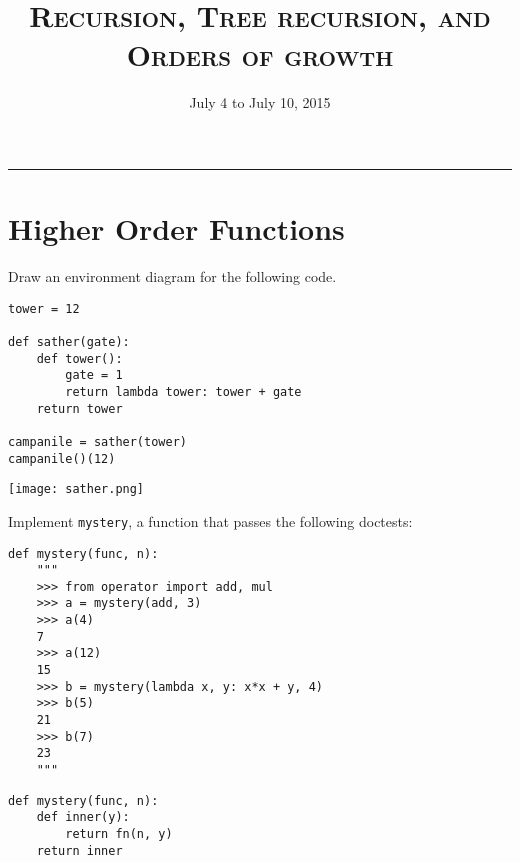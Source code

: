 \documentclass{exam}
\title{\textsc{Recursion, Tree recursion, and Orders of growth}}
\date{July 4 to July 10, 2015}
\begin{document}
\maketitle
\rule{\textwidth}{0.15em}
\fontsize{12}{15}\selectfont


\section{Higher Order Functions}

\begin{questions}


\begin{blocksection}
\question Draw an environment diagram for the following code.

\begin{lstlisting}
tower = 12

def sather(gate):
    def tower():
        gate = 1
        return lambda tower: tower + gate
    return tower

campanile = sather(tower)
campanile()(12)
\end{lstlisting}
\end{blocksection}

\begin{solution}
   \texttt{[image: sather.png]} 
\end{solution}



\begin{blocksection}
\question Implement \texttt{mystery}, a function that passes the following doctests:

\begin{lstlisting}
def mystery(func, n):
    """
    >>> from operator import add, mul
    >>> a = mystery(add, 3)
    >>> a(4)
    7
    >>> a(12)
    15
    >>> b = mystery(lambda x, y: x*x + y, 4)
    >>> b(5)
    21
    >>> b(7)
    23
    """
\end{lstlisting}

\begin{solution}[1.5in]
\begin{lstlisting}
def mystery(func, n):
    def inner(y):
        return fn(n, y)
    return inner
\end{lstlisting}
\end{solution}
\end{blocksection}
\end{questions}
\end{document}
